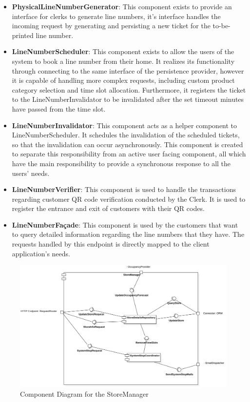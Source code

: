 \begin{itemize}
    \item \textbf{PhysicalLineNumberGenerator}: This component exists to provide an interface for clerks to generate line numbers, it's interface handles the incoming request by generating and persisting a new ticket for the to-be-printed line number.
    \item \textbf{LineNumberScheduler}: This component exists to allow the users of the system to book a line number from their home.
    It realizes its functionality through connecting to the same interface of the persistence provider, however it is capable of handling more complex requests, including custom product category selection and time slot allocation.
    Furthermore, it registers the ticket to the LineNumberInvalidator to be invalidated after the set timeout minutes have passed from the time slot.
    \item \textbf{LineNumberInvalidator}: This component acts as a helper component to LineNumberScheduler.
    It schedules the invalidation of the scheduled tickets, so that the invalidation can occur asynchronously.
    This component is created to separate this responsibility from an active user facing component, all which have the main responsibility to provide a synchronous response to all the users' needs.
    \item \textbf{LineNumberVerifier}: This component is used to handle the transactions regarding customer QR code verification conducted by the Clerk.
    It is used to register the entrance and exit of customers with their QR codes.
    \item \textbf{LineNumberFa\c{c}ade}: This component is used by the customers that want to query detailed information regarding the line numbers that they have.
    The requests handled by this endpoint is directly mapped to the client application's needs.

\end{itemize}
\begin{figure}[H]
    \centering
    \includegraphics[height=0.4\textwidth]{Images/ComponentDiagrams/StoreManager.png}
    \caption{Component Diagram for the StoreManager}
    \label{fig:CDStoreManager}
\end{figure}
